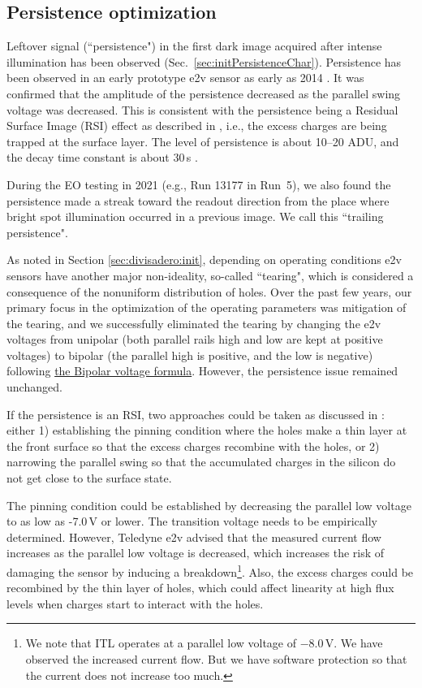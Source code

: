
\subsection{Persistence optimization}\label{sec:persistence-optimization}


Leftover signal (``persistence") in the first dark image acquired after intense illumination has
been observed (Sec.~\ref{sec:initPersistenceChar}).  Persistence has been observed
in an early prototype e2v sensor as early as 2014
\citep{2014SPIE.9154E..18D}. It was confirmed that the amplitude of
the persistence decreased as the parallel swing voltage was decreased.
This is consistent with the persistence being a Residual Surface Image (RSI) effect as described in
\citet{2001sccd.book.....J}, i.e., the excess charges are being trapped
at the surface layer. The level of persistence is about 10--20 ADU,
and the decay time constant is about 30\,s
\citep{dmtn-276}.

During the EO testing in 2021 (e.g., Run 13177 in Run~5), we also found the persistence made a
streak toward the readout direction from the place where bright spot illumination occurred 
in a previous image. We call this ``trailing persistence".

As noted in Section \ref{sec:divisadero:init}, depending on operating conditions e2v sensors have another major non-ideality, so-called ``tearing", which is
considered a consequence of the nonuniform distribution of holes. Over the past few years, our
primary focus in the optimization of the operating parameters was mitigation of the tearing, and we successfully eliminated the tearing by changing the
e2v voltages from unipolar (both parallel rails high and low
are kept at positive voltages) to bipolar (the parallel high is positive, and
the low is negative) following \href{https://github.com/lsst-camera-dh/mkconfigs/blob/master/newformula.py}{the Bipolar voltage formula}.
However, the persistence issue
remained unchanged.

If the persistence is an RSI, two
approaches could be taken as discussed in \citet{2024SPIE13103E..0WU}:  
either 1) establishing the pinning condition where the holes make a thin
layer at the front surface so that the excess charges recombine with
the holes, or 2) narrowing the parallel swing so that the accumulated
charges in the silicon do not get close to the surface state.

The pinning condition could be established by decreasing the parallel low
voltage to as low as -7.0\,V or lower. The transition voltage needs to be
empirically determined. However, Teledyne e2v advised that the measured
current flow increases as the parallel low voltage is decreased, which
increases the risk of damaging the sensor by inducing a
breakdown\footnote{We note that ITL operates at a parallel low voltage
  of $-$8.0\,V. We have observed the increased current flow. But we have
  software protection so that the current does not increase too much.}.
Also, the excess charges could be recombined by the thin layer of
 holes, which could affect linearity at high flux levels when
charges start to interact with the holes.

